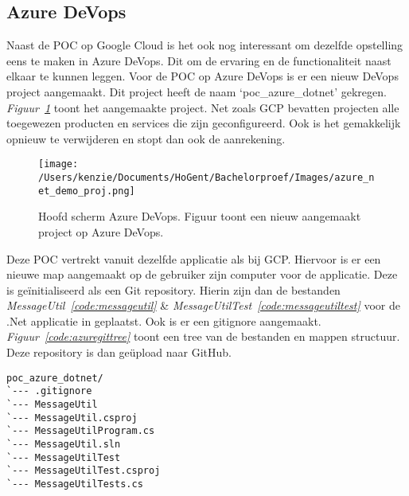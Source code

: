 \subsection{Azure DeVops}
\label{sec:VergelijkingADV}
Naast de POC op Google Cloud is het ook nog interessant om dezelfde opstelling eens te maken in Azure DeVops. Dit om de ervaring en de functionaliteit naast elkaar te kunnen leggen. Voor de POC op Azure DeVops is er een nieuw DeVops project aangemaakt. Dit project heeft de naam ‘poc\_azure\_dotnet’ gekregen. \emph{Figuur~\ref{fig:Azure_POC_proj}} toont het aangemaakte project. Net zoals GCP bevatten projecten alle toegewezen producten en services die zijn geconfigureerd. Ook is het gemakkelijk opnieuw te verwijderen en stopt dan ook de aanrekening.

\begin{figure}[!htbp]
    \centering
    \texttt{[image: /Users/kenzie/Documents/HoGent/Bachelorproef/Images/azure\_net\_demo\_proj.png]}
    \caption{Hoofd scherm Azure DeVops. Figuur toont een nieuw aangemaakt project op Azure DeVops.}
    \label{fig:Azure_POC_proj}
\end{figure}

Deze POC vertrekt vanuit dezelfde applicatie als bij GCP. Hiervoor is er een nieuwe map aangemaakt op de gebruiker zijn computer voor de applicatie. Deze is geïnitialiseerd als een Git repository. Hierin zijn dan de bestanden \emph{MessageUtil~\ref{code:messageutil}} \& \emph{MessageUtilTest~\ref{code:messageutiltest}} voor de .Net applicatie in geplaatst. Ook is er een gitignore aangemaakt. \emph{Figuur~\ref{code:azuregittree}} toont een tree van de bestanden en mappen structuur. Deze repository is dan geüpload naar GitHub.

\begin{lstlisting}
poc_azure_dotnet/
`--- .gitignore
`--- MessageUtil
`--- MessageUtil.csproj
`--- MessageUtilProgram.cs
`--- MessageUtil.sln
`--- MessageUtilTest
`--- MessageUtilTest.csproj
`--- MessageUtilTests.cs
\end{lstlisting}

